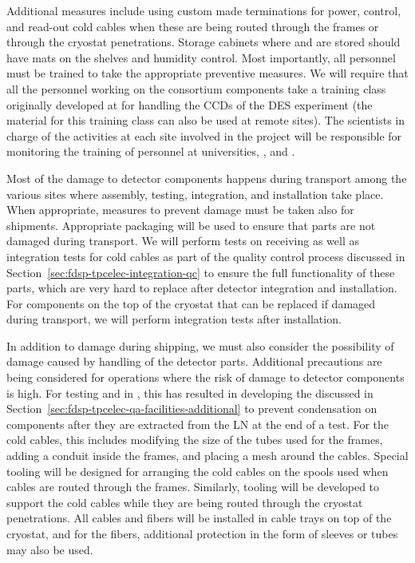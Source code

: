 Additional measures
include using custom made terminations for 
power, control, and read-out cold cables when these
are being routed through the  frames or through the
cryostat penetrations. Storage cabinets where  and
 are stored should have  mats
on the shelves and humidity control. Most importantly, all personnel must be trained to take the appropriate preventive measures. We 
will require that all the personnel working on the  
consortium components take a training class originally developed 
at  for handling the  CCDs of the DES experiment (the 
material for this training class can also be used at remote 
sites). The scientists in charge of the  activities at each site involved in the project will be responsible for monitoring the training of personnel at universities, 
, and .

Most of the damage to detector components happens during 
transport among the various sites where assembly, testing, integration,
and installation take place. When appropriate, measures to prevent
 damage must be taken also for shipments. Appropriate 
packaging will be used to ensure that parts are not damaged
during transport. We will perform tests on receiving  
 as well as integration tests for cold cables as
part of the quality control process discussed in 
Section~\ref{sec:fdsp-tpcelec-integration-qc} to ensure the 
full functionality of these parts, which are very hard to replace 
after detector integration and installation. For  
components on the top of the cryostat that
can be replaced if damaged during transport, we will 
perform integration tests after installation.

In addition to damage during shipping, we must also consider the
possibility of damage caused by handling of the detector parts.
Additional precautions are being considered for operations where
the risk of damage to  detector components is
high. For testing  and  
in \lntwo, this has resulted in developing the
 discussed in Section~\ref{sec:fdsp-tpcelec-qa-facilities-additional}
to prevent condensation on components after they are extracted from
the LN  at the end of a test. For the cold cables, this 
includes modifying the size of the tubes used for the  frames,
adding a conduit inside the frames, and placing a mesh around 
the cables. Special tooling will be designed for arranging the
cold cables on the spools used when cables are routed through
the  frames. Similarly, tooling will be developed to 
support the cold cables while they are being routed through the 
cryostat penetrations. All cables and fibers will
be installed in cable trays on top of the cryostat, and for the fibers, additional protection in the form of sleeves or tubes 
may also be used. 

